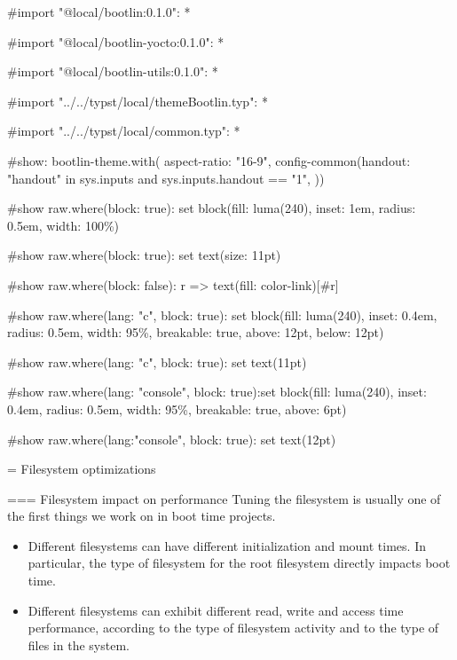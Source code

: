 #import "@local/bootlin:0.1.0": *

#import "@local/bootlin-yocto:0.1.0": *

#import "@local/bootlin-utils:0.1.0": *

#import "../../typst/local/themeBootlin.typ": *

#import "../../typst/local/common.typ": *

#show: bootlin-theme.with( aspect-ratio: "16-9", config-common(handout: "handout" in sys.inputs and sys.inputs.handout == "1", ))

#show raw.where(block: true): set block(fill: luma(240), inset: 1em, radius: 0.5em, width: 100\%)

#show raw.where(block: true): set text(size: 11pt)

#show raw.where(block: false): r => text(fill: color-link)[#r]

#show raw.where(lang: "c", block: true): set block(fill: luma(240), inset: 0.4em, radius: 0.5em, width: 95\%, breakable: true, above: 12pt, below: 12pt)

#show raw.where(lang: "c", block: true): set text(11pt)

#show raw.where(lang: "console", block: true):set block(fill: luma(240), inset: 0.4em, radius: 0.5em, width: 95\%, breakable: true, above: 6pt)

#show raw.where(lang:"console", block: true): set text(12pt)

 = Filesystem optimizations

=== Filesystem impact on performance Tuning the filesystem is usually one of the first things we work on in boot time projects.
\begin{itemize}
\item Different filesystems can have different initialization
      and mount times. In particular, the type of filesystem
      for the root filesystem directly impacts boot time.
\item Different filesystems can exhibit different read, write
      and access time performance, according to the type
      of filesystem activity and to the type of files in the
      system.
\end{itemize}


